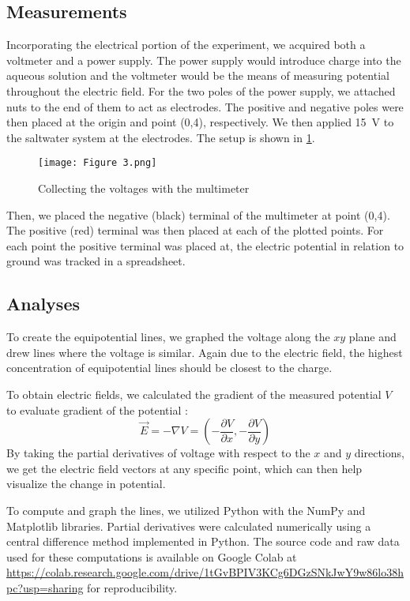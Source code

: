 \documentclass[10pt,journal,twoside]{IEEEtran}
\begin{document}
\subsection{Measurements}
Incorporating the electrical portion of the experiment, we acquired both a voltmeter and a power supply. The power supply would introduce charge into the aqueous solution and the voltmeter would be the means of measuring potential throughout the electric field. For the two poles of the power supply, we attached nuts to the end of them to act as electrodes. The positive and negative poles were then placed at the origin and point (0,4), respectively. We then applied \qty{15}{\volt} to the saltwater system at the electrodes. The setup is shown in \cref{fig:3}.
\begin{figure}
\begin{center}
\texttt{[image: Figure 3.png]}
\end{center}
\caption{Collecting the voltages with the multimeter}
\label{fig:3}
\end{figure}
Then, we placed the negative (black) terminal of the multimeter at point (0,4). The positive (red) terminal was then placed at each of the plotted points. For each point the positive terminal was placed at, the electric potential in relation to ground was tracked in a spreadsheet. 

\subsection{Analyses}
To create the equipotential lines, we graphed the voltage along the $xy$ plane and drew lines where the voltage is similar. Again due to the electric field, the highest concentration of equipotential lines should be closest to the charge.

To obtain electric fields, we calculated the gradient of the measured potential $V$ to evaluate gradient of the potential \cite{tipler,stewart,cantt-2013-equipotential,fongsuwan-2019-system}:
\begin{equation}
\vec{E} = -\nabla V = \left( -\frac{\partial V}{\partial x}, -\frac{\partial V}{\partial y} \right)
\label{eq:1}
\end{equation}
By taking the partial derivatives of voltage with respect to the $x$ and $y$ directions, we get the electric field vectors at any specific point, which can then help visualize the change in potential.

To compute and graph the lines, we utilized Python with the NumPy \cite{harris2020array} and Matplotlib \cite{hunter:2007} libraries. Partial derivatives were calculated numerically using a central difference method implemented in Python. The source code and raw data used for these computations is available on Google Colab at \url{https://colab.research.google.com/drive/1tGvBPIV3KCg6DGzSNkJwY9w86lo38hpc?usp=sharing} for reproducibility.
\end{document}
